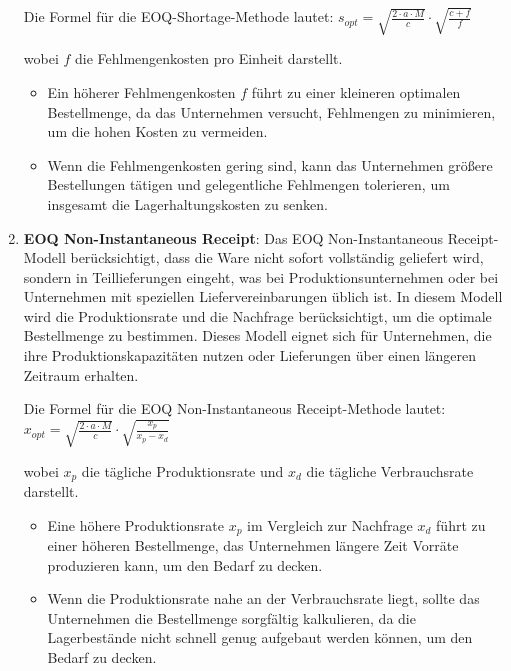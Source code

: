 \documentclass[a4paper,12pt]{article}
\begin{document}
\begin{enumerate}
    Die Formel für die EOQ-Shortage-Methode lautet:
    $s_{opt} = \sqrt{\frac{2 \cdot a \cdot M}{c}} \cdot \sqrt{\frac{c + f}{f}}$

    wobei $f$ die Fehlmengenkosten pro Einheit darstellt. 
    \begin{itemize}
        \item Ein höherer Fehlmengenkosten $f$ führt zu einer kleineren optimalen Bestellmenge, da das Unternehmen versucht, Fehlmengen zu minimieren, um die hohen Kosten zu vermeiden.
        \item Wenn die Fehlmengenkosten gering sind, kann das Unternehmen größere Bestellungen tätigen und gelegentliche Fehlmengen tolerieren, um insgesamt die Lagerhaltungskosten zu senken.
    \end{itemize}


    \item \textbf{EOQ Non-Instantaneous Receipt}:\newline
    Das EOQ Non-Instantaneous Receipt-Modell berücksichtigt, dass die Ware nicht sofort vollständig geliefert wird,
    sondern in Teillieferungen eingeht, was bei Produktionsunternehmen oder bei Unternehmen mit speziellen Liefervereinbarungen üblich ist.
    In diesem Modell wird die Produktionsrate und die Nachfrage berücksichtigt, um die optimale Bestellmenge zu bestimmen. 
    Dieses Modell eignet sich für Unternehmen, die ihre Produktionskapazitäten nutzen oder Lieferungen über einen längeren Zeitraum erhalten.

    Die Formel für die EOQ Non-Instantaneous Receipt-Methode lautet:
    $x_{opt} = \sqrt{\frac{2 \cdot a \cdot M}{c}} \cdot \sqrt{\frac{x_p}{x_p - x_d}}$

    wobei $x_p$ die tägliche Produktionsrate und $x_d$ die tägliche Verbrauchsrate darstellt.
    \begin{itemize}
        \item Eine höhere Produktionsrate $x_p$ im Vergleich zur Nachfrage $x_d$ führt zu einer höheren Bestellmenge,
        das Unternehmen längere Zeit Vorräte produzieren kann, um den Bedarf zu decken.
        \item Wenn die Produktionsrate nahe an der Verbrauchsrate liegt,
        sollte das Unternehmen die Bestellmenge sorgfältig kalkulieren, da die Lagerbestände nicht schnell genug aufgebaut werden können,
        um den Bedarf zu decken.
    \end{itemize}

\end{enumerate}
\cite[Kapitel 3.6.4]{Gronwald2020}
\end{document}
